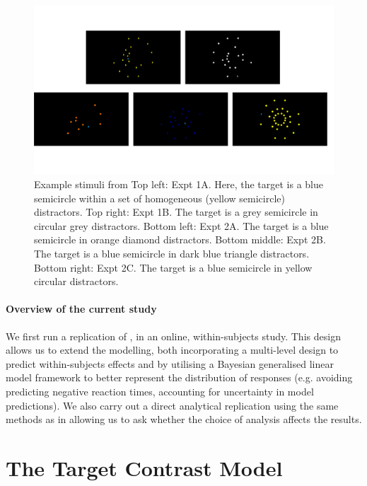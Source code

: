 \documentclass[smallextended]{svjour3}       %
\begin{document}
\begin{figure}
\centering
\includegraphics[width=\textwidth]{../plots/example_stimuli_figure.pdf}
\caption{Example stimuli from \cite{buetti2019predicting} Top left: Expt 1A. Here, the target is a blue semicircle within a set of homogeneous (yellow semicircle) distractors. Top right: Expt 1B. The target is a grey semicircle in circular grey distractors. Bottom left: Expt 2A. The target is a blue semicircle in orange diamond distractors. Bottom middle: Expt 2B. The target is a blue semicircle in dark blue triangle distractors. Bottom right: Expt 2C. The target is a blue semicircle in yellow circular distractors.}
\label{fig:buetti2019_stimulus}
\end{figure}

\paragraph{Overview of the current study}
We first run a replication of \cite{buetti2019predicting}, in an online, within-subjects study. This design allows us to extend the modelling, both incorporating a multi-level design to predict within-subjects effects and by utilising a Bayesian generalised linear model framework to better represent the distribution of responses (e.g. avoiding predicting negative reaction times, accounting for uncertainty in model predictions). We  also carry out a direct analytical replication using the same methods as in \cite{buetti2019predicting} allowing us to ask whether the choice of analysis affects the results.

\section{The Target Contrast Model}
\label{sec:reansalysis}
\end{document}

